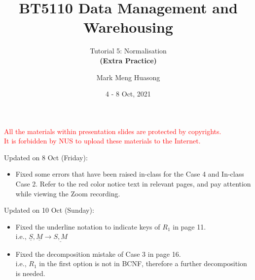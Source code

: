 
\title{BT5110 Data Management and Warehousing}

\subtitle{Tutorial 5: Normalisation\\ \textbf{(Extra Practice)}}

\author{Mark Meng Huasong}



\date{4 - 8 Oct, 2021}

\begin{frame}
	\titlepage
	\begin{tcolorbox}
		\begin{center}
			{\scriptsize \textcolor{red}{All the materials within presentation slides are protected by copyrights.\\
					It is forbidden by NUS to upload these materials to the Internet.}}
		\end{center}
	\end{tcolorbox}
\end{frame}

\begin{frame}
	Updated on 8 Oct (Friday):
	\begin{itemize}
		\item Fixed some errors that have been raised in-class for the Case 4 and In-class Case 2. Refer to the red color notice text in relevant pages, and pay attention while viewing the Zoom recording. 
	\end{itemize}
	Updated on 10 Oct (Sunday):
	\begin{itemize}
		\item Fixed the underline notation to indicate keys of $R_1$ in page 11.\\
		i.e., $\underline{S},\underline{M} \rightarrow\underline{S,M}$
		\item Fixed the decomposition mistake of Case 3 in page 16.\\
		i.e., $R_1$ in the first option is not in BCNF, therefore a further decomposition is needed. 
	\end{itemize}
\end{frame}

